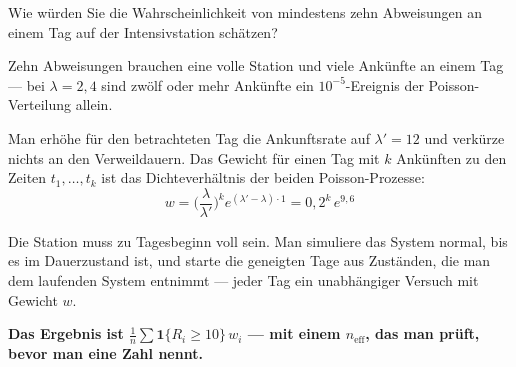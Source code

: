 \begin{aufgabe}
Wie würden Sie die Wahrscheinlichkeit von mindestens zehn Abweisungen an einem Tag auf der Intensivstation schätzen?

\loesung
{}
Zehn Abweisungen brauchen eine volle Station und viele Ankünfte an einem Tag --- bei $\lambda = 2{,}4$ sind zwölf oder mehr Ankünfte ein $10^{-5}$-Ereignis der Poisson-Verteilung allein.

Man erhöhe für den betrachteten Tag die Ankunftsrate auf $\lambda' = 12$ und verkürze nichts an den Verweildauern. Das Gewicht für einen Tag mit $k$ Ankünften zu den Zeiten $t_1,\ldots,t_k$ ist das Dichteverhältnis der beiden Poisson-Prozesse:
\[ w = \Big(\frac{\lambda}{\lambda'}\Big)^{k} e^{(\lambda'-\lambda)\cdot 1} = 0{,}2^{k}\,e^{9{,}6} \]

Die Station muss zu Tagesbeginn voll sein. Man simuliere das System normal, bis es im Dauerzustand ist, und starte die geneigten Tage aus Zuständen, die man dem laufenden System entnimmt --- jeder Tag ein unabhängiger Versuch mit Gewicht $w$.

\begin{center}
\begin{minipage}{0.9\textwidth}
\textbf{Das Ergebnis ist $\frac1n\sum \mathbf 1\{R_i\ge10\}\,w_i$ --- mit einem $n_{\text{eff}}$, das man prüft, bevor man eine Zahl nennt.}
\end{minipage}
\end{center}

\begin{center}
\begin{minipage}{0.88\textwidth}
\end{minipage}
\end{center}
\end{aufgabe}

